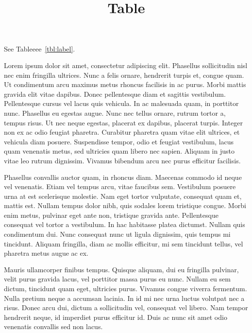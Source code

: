\documentclass[
]{article}
\title{Table}
\author{}
\date{}
\begin{document}
\maketitle

See Tableeee~\ref{tbl:label}.

\leavevmode\hypertarget{tbl:charles}{}%
Lorem ipsum dolor sit amet, consectetur adipiscing elit. Phasellus
sollicitudin nisl nec enim fringilla ultrices. Nunc a felis ornare,
hendrerit turpis et, congue quam. Ut condimentum arcu maximus metus
rhoncus facilisis in ac purus. Morbi mattis gravida elit vitae dapibus.
Donec pellentesque diam et sagittis vestibulum. Pellentesque cursus vel
lacus quis vehicula. In ac malesuada quam, in porttitor nunc. Phasellus
eu egestas augue. Nunc nec tellus ornare, rutrum tortor a, tempus risus.
Ut nec neque egestas, placerat ex dapibus, placerat turpis. Integer non
ex ac odio feugiat pharetra. Curabitur pharetra quam vitae elit
ultrices, et vehicula diam posuere. Suspendisse tempor, odio et feugiat
vestibulum, lacus quam venenatis metus, sed ultricies quam libero nec
sapien. Aliquam in justo vitae leo rutrum dignissim. Vivamus bibendum
arcu nec purus efficitur facilisis.

Phasellus convallis auctor quam, in rhoncus diam. Maecenas commodo id
neque vel venenatis. Etiam vel tempus arcu, vitae faucibus sem.
Vestibulum posuere urna at est scelerisque molestie. Nam eget tortor
vulputate, consequat quam et, mattis est. Nullam tempus dolor nibh, quis
sodales lorem tristique congue. Morbi enim metus, pulvinar eget ante
non, tristique gravida ante. Pellentesque consequat vel tortor a
vestibulum. In hac habitasse platea dictumst. Nullam quis condimentum
dui. Nunc consequat nunc ut ligula dignissim, quis tempus mi tincidunt.
Aliquam fringilla, diam ac mollis efficitur, mi sem tincidunt tellus,
vel pharetra metus augue ac ex.

Mauris ullamcorper finibus tempus. Quisque aliquam, dui eu fringilla
pulvinar, velit purus gravida lacus, vel porttitor massa purus eu nunc.
Nullam eu sem dictum, tincidunt quam eget, ultricies purus. Vivamus
congue viverra fermentum. Nulla pretium neque a accumsan lacinia. In id
mi nec urna luctus volutpat nec a risus. Donec arcu dui, dictum a
sollicitudin vel, consequat vel libero. Nam tempor hendrerit neque, id
imperdiet purus efficitur id. Duis ac nunc sit amet odio venenatis
convallis sed non lacus.
\end{document}
